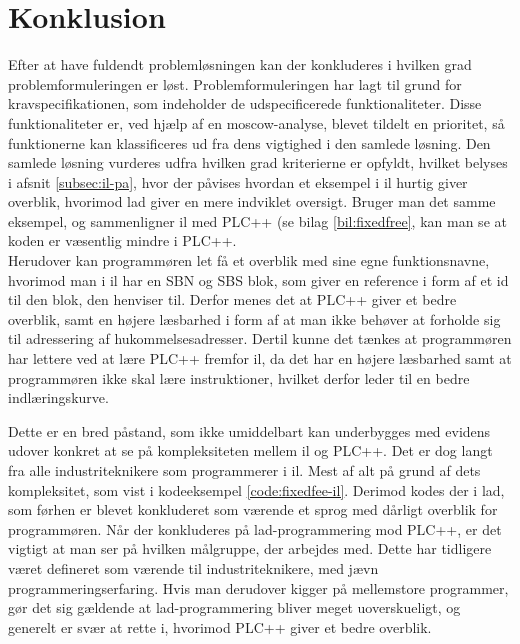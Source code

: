 \chapter{Konklusion}
\label{sec:konklusion}

Efter at have fuldendt problemløsningen kan der konkluderes i hvilken grad problemformuleringen er løst.
Problemformuleringen har lagt til grund for kravspecifikationen, som indeholder de udspecificerede funktionaliteter.
Disse funktionaliteter er, ved hjælp af en \gls{moscow}-analyse, blevet tildelt en prioritet, så funktionerne kan klassificeres ud fra dens vigtighed i den samlede løsning.
Den samlede løsning vurderes udfra hvilken grad kriterierne er opfyldt, hvilket belyses i afsnit \ref{subsec:il-pa}, hvor der påvises hvordan et eksempel i \gls{il} hurtig giver overblik, hvorimod \gls{lad} giver en mere indviklet oversigt. Bruger man det samme eksempel, og sammenligner \gls{il} med PLC++ (se bilag \ref{bil:fixedfree}, kan man se at koden er væsentlig mindre i PLC++.\\

\noindent Herudover kan programmøren let få et overblik med sine egne funktionsnavne, hvorimod man i \gls{il} har en SBN og SBS blok, som giver en reference i form af et id til den blok, den henviser til.
Derfor menes det at PLC++ giver et bedre overblik, samt en højere læsbarhed i form af at man ikke behøver at forholde sig til adressering af hukommelsesadresser.
Dertil kunne det tænkes at programmøren har lettere ved at lære PLC++ fremfor \gls{il}, da det har en højere  læsbarhed samt at programmøren ikke skal lære instruktioner, hvilket derfor leder til en bedre indlæringskurve. 

Dette er en bred påstand, som ikke umiddelbart kan underbygges med evidens udover konkret at se på kompleksiteten mellem \gls{il} og PLC++.
Det er dog langt fra alle industriteknikere som programmerer i \gls{il}. Mest af alt på grund af dets kompleksitet, som vist i kodeeksempel \ref{code:fixedfee-il}.
Derimod kodes der i \gls{lad}, som førhen er blevet konkluderet som værende et sprog med dårligt overblik for programmøren.
Når der konkluderes på \gls{lad}-programmering mod PLC++, er det vigtigt at man ser på hvilken målgruppe, der arbejdes med.
Dette har tidligere været defineret som værende til industriteknikere, med jævn programmeringserfaring.
Hvis man derudover kigger på mellemstore programmer, gør det sig gældende at \gls{lad}-programmering bliver meget uoverskueligt, og generelt er svær at rette i, hvorimod PLC++ giver et bedre overblik.\\

